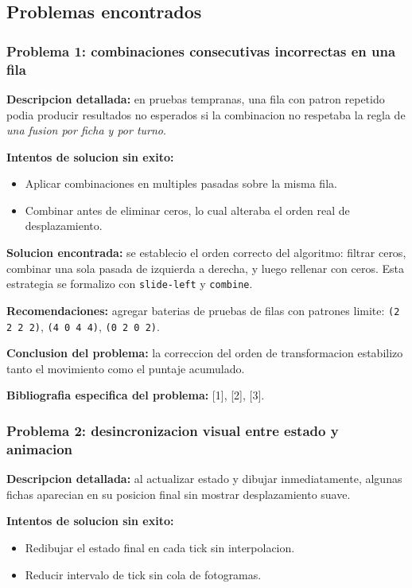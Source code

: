 \documentclass[12pt,a4paper]{article}
\begin{document}
\subsection{Problemas encontrados}

\subsubsection*{Problema 1: combinaciones consecutivas incorrectas en una fila}
\textbf{Descripcion detallada:} en pruebas tempranas, una fila con patron repetido podia producir resultados no esperados si la combinacion
no respetaba la regla de \textit{una fusion por ficha y por turno}.

\textbf{Intentos de solucion sin exito:}
\begin{itemize}
    \item Aplicar combinaciones en multiples pasadas sobre la misma fila.
    \item Combinar antes de eliminar ceros, lo cual alteraba el orden real de desplazamiento.
\end{itemize}

\textbf{Solucion encontrada:}
se establecio el orden correcto del algoritmo: filtrar ceros, combinar una sola pasada de izquierda a derecha,
y luego rellenar con ceros. Esta estrategia se formalizo con \texttt{slide-left} y \texttt{combine}.

\textbf{Recomendaciones:}
agregar baterias de pruebas de filas con patrones limite: \texttt{(2 2 2 2)}, \texttt{(4 0 4 4)}, \texttt{(0 2 0 2)}.

\textbf{Conclusion del problema:}
la correccion del orden de transformacion estabilizo tanto el movimiento como el puntaje acumulado.

\textbf{Bibliografia especifica del problema:}
[1], [2], [3].

\subsubsection*{Problema 2: desincronizacion visual entre estado y animacion}
\textbf{Descripcion detallada:} al actualizar estado y dibujar inmediatamente, algunas fichas aparecian en su posicion final
sin mostrar desplazamiento suave.

\textbf{Intentos de solucion sin exito:}
\begin{itemize}
    \item Redibujar el estado final en cada tick sin interpolacion.
    \item Reducir intervalo de tick sin cola de fotogramas.
\end{itemize}
\end{document}
